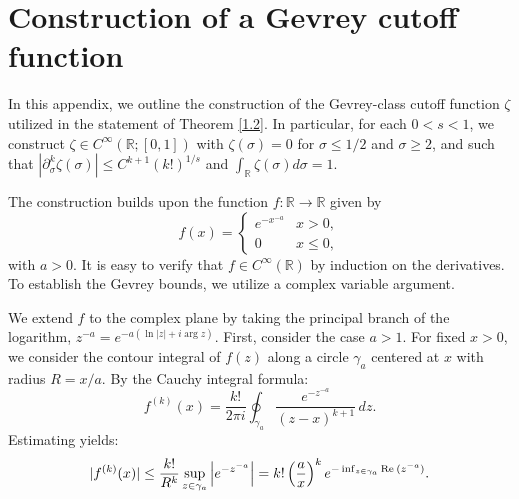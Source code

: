 \documentclass[11pt]{amsart}
\numberwithin{equation}{section}
\def\R{{\mathbb R}}
\def\Re{{\rm Re}\:}
\begin{document}
\appendix

\section{Construction of a Gevrey cutoff function} \label{gevrey cutoff appendix}

In this appendix, we outline the construction of the Gevrey-class cutoff function $\zeta$ utilized in the statement of Theorem \ref{1.2}. In particular, for each $0 < s < 1$, we construct $\zeta \in C^{\infty}(\mathbb{R}; [0,1])$ with $\zeta(\sigma) = 0$ for $\sigma \le 1/2$ and $\sigma \ge 2$, and such that $|\partial_\sigma^k \zeta(\sigma)| \le C^{k+1}(k!)^{1/s}$ and $\int_{\R} \zeta(\sigma) d\sigma = 1$.

The construction builds upon the function $f : \R \to \R$ given by
\begin{equation*}
    f(x) = \begin{cases} 
    e^{-x^{-a}} & x > 0, \\
    0 & x \le 0, 
    \end{cases}
\end{equation*}
with $a > 0$. It is easy to verify that $f \in C^\infty(\mathbb{R})$ by induction on the derivatives. To establish the Gevrey bounds, we utilize a complex variable argument. 

We extend $f$ to the complex plane by taking the principal branch of the logarithm, $z^{-a} = e^{-a(\ln|z| + i \arg z)}$. First, consider the case $a > 1$. For fixed $x > 0$, we consider the contour integral of $f(z)$ along a circle $\gamma_a$ centered at $x$ with radius $R = x/a$. By the Cauchy integral formula:
\begin{equation*}
    f^{(k)}(x) = \frac{k!}{2\pi i} \oint_{\gamma_a} \frac{e^{-z^{-a}}}{(z-x)^{k+1}} \, dz.
\end{equation*}
Estimating yields:
\begin{equation*}
    |f^{(k)}(x)| \le \frac{k!}{R^k} \sup_{z \in \gamma_a} \left| e^{-z^{-a}} \right| = k! \left(\frac{a}{x}\right)^k e^{-\inf_{z \in \gamma_a} \Re(z^{-a})}.
\end{equation*}
\end{document}
